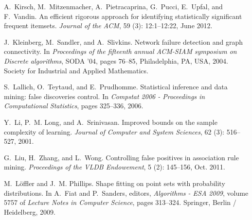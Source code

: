 \begin{thebibliography}{42}
A.~Kirsch, M.~Mitzenmacher, A.~Pietracaprina, G.~Pucci, E.~Upfal, and
  F.~Vandin.
\newblock An efficient rigorous approach for identifying statistically
  significant frequent itemsets.
\newblock \emph{Journal of the ACM}, 59 (3): 12:1--12:22,
  June 2012.

J.~Kleinberg, M.~Sandler, and A.~Slivkins.
\newblock Network failure detection and graph connectivity.
\newblock In \emph{Proceedings of the fifteenth annual ACM-SIAM symposium on
  Discrete algorithms}, SODA '04, pages 76--85, Philadelphia, PA, USA, 2004.
  Society for Industrial and Applied Mathematics.

S.~Lallich, O.~Teytaud, and E.~Prudhomme.
\newblock Statistical inference and data mining: false discoveries control.
\newblock In \emph{Compstat 2006 - Proceedings in Computational Statistics},
  pages 325--336, 2006.

Y.~Li, P.~M. Long, and A.~Srinivasan.
\newblock Improved bounds on the sample complexity of learning.
\newblock \emph{Journal of Computer and System Sciences}, 62
  (3): 516--527, 2001.

G.~Liu, H.~Zhang, and L.~Wong.
\newblock Controlling false positives in association rule mining.
\newblock \emph{Proceedings of the VLDB Endowement}, 5 (2):
  145--156, Oct. 2011.

M.~L\"{o}ffler and J.~M. Phillips.
\newblock Shape fitting on point sets with probability distributions.
\newblock In A.~Fiat and P.~Sanders, editors, \emph{Algorithms - ESA 2009},
  volume 5757 of \emph{Lecture Notes in Computer Science}, pages 313--324.
  Springer, Berlin / Heidelberg, 2009.


\end{thebibliography}
